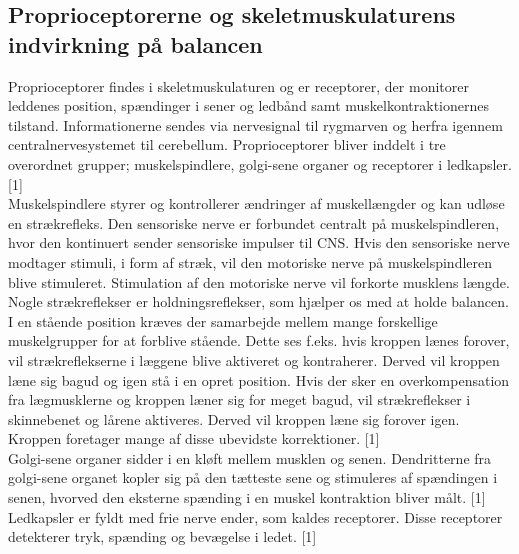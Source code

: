 \subsection{Proprioceptorerne og skeletmuskulaturens indvirkning på balancen}
Proprioceptorer findes i skeletmuskulaturen og er receptorer, der monitorer leddenes position, spændinger i sener og ledbånd samt muskelkontraktionernes tilstand. Informationerne sendes via nervesignal til rygmarven og herfra igennem centralnervesystemet til cerebellum. Proprioceptorer bliver inddelt i tre overordnet grupper; muskelspindlere, golgi-sene organer og receptorer i ledkapsler.[1] \\
Muskelspindlere styrer og kontrollerer ændringer af muskellængder og kan udløse en strækrefleks. Den sensoriske nerve er forbundet centralt på muskelspindleren, hvor den kontinuert sender sensoriske impulser til CNS. Hvis den sensoriske nerve modtager stimuli, i form af stræk, vil den motoriske nerve på muskelspindleren blive stimuleret. Stimulation af den motoriske nerve vil forkorte musklens længde. Nogle strækreflekser er holdningsreflekser, som hjælper os med at holde balancen. I en stående position kræves der samarbejde mellem mange forskellige muskelgrupper for at forblive stående. Dette ses f.eks. hvis kroppen lænes forover, vil strækreflekserne i læggene blive aktiveret og kontraherer. Derved vil kroppen læne sig bagud og igen stå i en opret position. Hvis der sker en overkompensation fra lægmusklerne og kroppen læner sig for meget bagud, vil strækreflekser i skinnebenet og lårene aktiveres. Derved vil kroppen læne sig forover igen. Kroppen foretager mange af disse ubevidste korrektioner. [1] \\ %
Golgi-sene organer sidder i en kløft mellem musklen og senen. Dendritterne fra golgi-sene organet kopler sig på den tætteste sene og stimuleres af spændingen i senen, hvorved den eksterne spænding i en muskel kontraktion bliver målt. [1] \\
Ledkapsler er fyldt med frie nerve ender, som kaldes receptorer. Disse receptorer detekterer tryk, spænding og bevægelse i ledet. [1]  %


